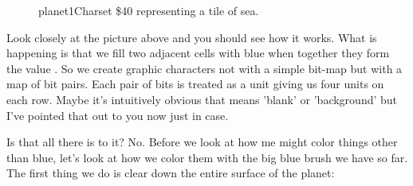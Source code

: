 \begin{figure}[H]
{\begin{adjustbox}{width=4cm,center}
    \end{adjustbox}
  }\caption{planet1Charset \$40 representing a tile of sea.}
\end{figure}

Look closely at the picture above and you should see how it works. What is happening is that we fill
two adjacent cells with blue when together they form the value . So
we create graphic characters not with a simple bit-map but with a map of bit pairs. Each pair of bits is treated as a
unit giving us four units on each row. Maybe it's intuitively obvious that 
means 'blank' or 'background' but I've pointed that out to you now just in case.

\lstset{style=6502Style}
%


Is that all there is to it? No. Before we look at how me might color things other than blue, let's look at how we color them
with the big blue brush we have so far. The first thing we do is clear down the entire surface of the planet:

%


